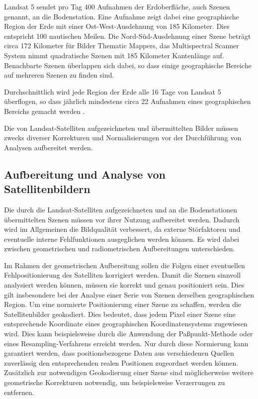 Landsat 5 sendet pro Tag 400 Aufnahmen der Erdoberfläche, auch Szenen genannt, an die Bodenstation. Eine Aufnahme zeigt dabei eine geographische Region der Erde mit einer Ost-West-Ausdehnung von 185 Kilometer. Dies entspricht 100 nautischen Meilen. Die Nord-Süd-Ausdehnung einer Szene beträgt circa 172 Kilometer für Bilder Thematic Mappers, das Multispectral Scanner System nimmt quadratische Szenen mit 185 Kilometer Kantenlänge auf. Benachbarte Szenen überlappen sich dabei, so dass einige geographische Bereiche auf mehreren Szenen zu finden sind.

Durchschnittlich wird jede Region der Erde alle 16 Tage von Landsat 5 überflogen, so dass jährlich mindestens circa 22 Aufnahmen eines geographischen Bereichs gemacht werden \cite{Irons2012}. 

Die von Landsat-Satelliten aufgezeichneten und übermittelten Bilder müssen zwecks diverser Korrekturen und Normalisierungen vor der Durchführung von Analysen aufbereitet werden.


\subsection{Aufbereitung und Analyse von Satellitenbildern}
Die durch die Landsat-Satelliten aufgezeichneten und an die Bodenstationen übermittelten Szenen müssen vor ihrer Nutzung aufbereitet werden. Dadurch wird im Allgemeinen die Bildqualität verbessert, da externe Störfaktoren und eventuelle interne Fehlfunktionen ausgeglichen werden können. Es wird dabei zwischen geometrischen und radiometrischen Aufbereitungen unterschieden. 

Im Rahmen der geometrischen Aufbereitung sollen die Folgen einer eventuellen Fehlpositionierung des Satelliten korrigiert werden. Damit die Szenen sinnvoll analysiert werden können, müssen sie korrekt und genau positioniert sein. Dies gilt insbesondere bei der Analyse einer Serie von Szenen derselben geographischen Region. Um eine normierte Positionierung einer Szene zu schaffen, werden die Satellitenbilder geokodiert. Dies bedeutet, dass jedem Pixel einer Szene eine entsprechende Koordinate eines geographischen Koordinatensystems zugewiesen wird. Dies kann beispielsweise durch die Anwendung der Paßpunkt-Methode oder eines Resampling-Verfahrens erreicht werden. Nur durch diese Normierung kann garantiert werden, dass positionsbezogene Daten aus verschiedenen Quellen zuverlässig den entsprechenden realen Positionen zugeordnet werden können. Zusätzlich zur notwendigen Geokodierung einer Szene sind möglicherweise weitere geometrische Korrekturen notwendig, um beispielsweise Verzerrungen zu entfernen. 

